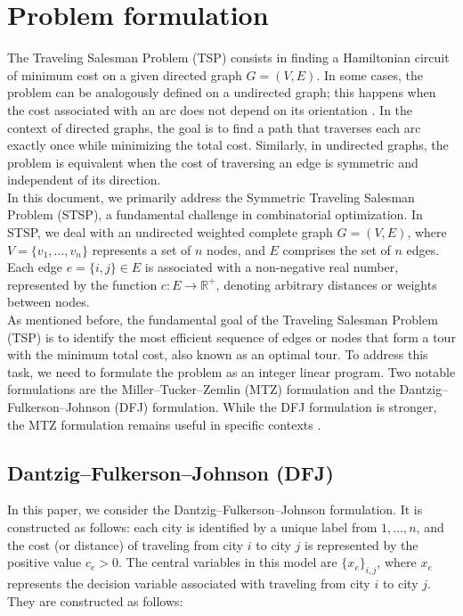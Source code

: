 \section{Problem formulation}
The Traveling Salesman Problem (TSP) consists in finding a Hamiltonian circuit of minimum cost on a given directed graph \( G = (V, E) \). In some cases, the problem can be analogously defined on a undirected graph; this happens when the cost associated with an arc does not depend on its orientation \cite{fischetti2019}. In the context of directed graphs, the goal is to find a path that traverses each arc exactly once while minimizing the total cost. Similarly, in undirected graphs, the problem is equivalent when the cost of traversing an edge is symmetric and independent of its direction. \\

\noindent In this document, we primarily address the Symmetric Traveling Salesman Problem (STSP), a fundamental challenge in combinatorial optimization. In STSP, we deal with an undirected weighted complete graph \( G = (V, E) \), where \( V = \{v_1, \ldots, v_n\} \) represents a set of \( n \) nodes, and \( E \) comprises the set of \( n \) edges. Each edge \( e = \{i, j\} \in E \) is associated with a non-negative real number, represented by the function \( c: E \rightarrow \mathbb{R}^+ \), denoting arbitrary distances or weights between nodes. \\

\noindent As mentioned before, the fundamental goal of the Traveling Salesman Problem (TSP) is to identify the most efficient sequence of edges or nodes that form a tour with the minimum total cost, also known as an optimal tour. To address this task, we need to formulate the problem as an integer linear program. Two notable formulations are the Miller--Tucker--Zemlin (MTZ) formulation and the Dantzig--Fulkerson--Johnson (DFJ) formulation. While the DFJ formulation is stronger, the MTZ formulation remains useful in specific contexts \cite{wiki:TSP}.

\newpage

\subsection{Dantzig–Fulkerson–Johnson (DFJ)}
\label{chap:DFJ}
In this paper, we consider the Dantzig–Fulkerson–Johnson formulation. It is constructed as follows: each city is identified by a unique label from \(1, \ldots, n\), and the cost (or distance) of traveling from city \(i\) to city \(j\) is represented by the positive value \(c_{e} > 0\). The central variables in this model are \(\{x_{e}\}_{i,j}\), where \(x_{e}\) represents the decision variable associated with traveling from city \(i\) to city \(j\). They are constructed as follows:

